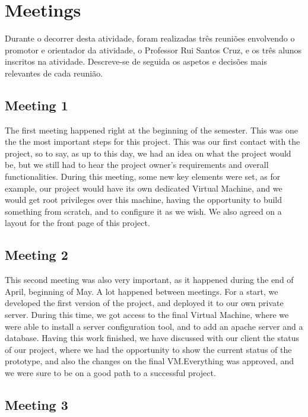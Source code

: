 \documentclass[a4paper,12pt,journal,twoside,compsoc]{PPIEEEtran}
\begin{document}

\section{Meetings}

Durante o decorrer desta atividade, foram realizadas três reuniões envolvendo o promotor e orientador da atividade, o Professor Rui Santos Cruz, e os três alunos inscritos na atividade. Descreve-se de seguida os aspetos e decisões mais relevantes de cada reunião.

\subsection{Meeting 1}

The first meeting happened right at the beginning of the semester. This was one the the most important steps for this project. This was our first contact with the project, so to say, as up to this day, we had an idea on what the project would be, but we still had to hear the project owner's requirements and overall functionalities. During this meeting, some new key elements were set, as for example, our project would have its own dedicated Virtual Machine, and we would get root privileges over this machine, having the opportunity to build something from scratch, and to configure it as we wish.
	We also agreed on a layout for the front page of this project.
	
\subsection{Meeting 2}

This second meeting was also very important, as it happened during the end of April, beginning of May. A lot happened between meetings. For a start, we developed the first version of the project, and deployed it to our own private server. During this time, we got access to the final Virtual Machine, where we were able to install a server configuration tool, and to add an apache server and a database.
Having this work finished, we have discussed with our client the status of our project, where we had the opportunity to show the current status of the prototype, and also the changes on the final VM.Everything was approved, and we were sure to be on a good path to a successful project.

\subsection{Meeting 3}
\end{document}
